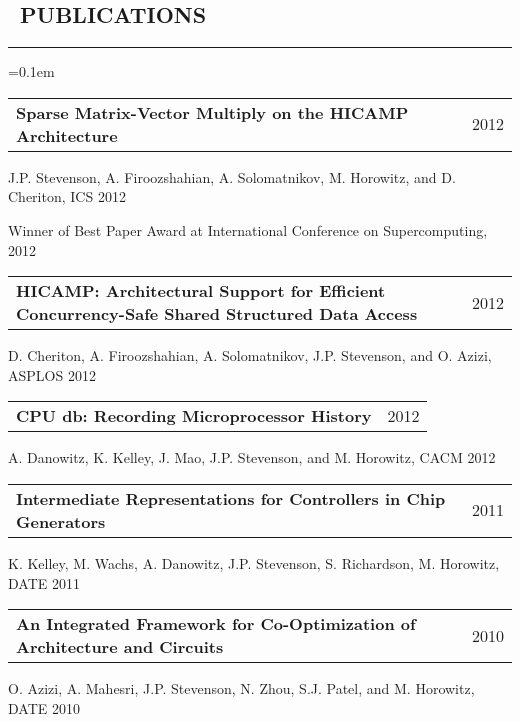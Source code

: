 \documentclass[10pt,letterpaper]{article}
\makeatletter
\newenvironment{indentsection}[1]%
{\begin{list}{}%
	{\setlength{\leftmargin}{#1}}%
	\item[]%
}
{\end{list}}
\newenvironment{changemargin}[2]
{%
    \begin{list}{}{%
        \setlength{\topsep}{0pt}%
        \setlength{\leftmargin}{#1}%
        \setlength{\rightmargin}{#2}%
        \setlength{\listparindent}{\parindent}%
        \setlength{\itemindent}{\parindent}%
        \setlength{\parsep}{\parskip}%
    }%
    \item[]
}%
{%
    \end{list}
}%
\newenvironment{content}
{%
    \begin{changemargin}{0cm}{2.5cm}
    \begin{itemize*}
        \vspace{-0.15em}
}%
{%
    \end{itemize*}
    \end{changemargin}
}%
\newenvironment{resumesection}[1]
{%
    \subsection*{\ #1}
    \vspace{-0.4em}
    \hrule
    \vspace{+0.4em}
    \begin{itemize}
        \parskip=0.1em
}%
{%
    \end{itemize}
}%
\newcommand{\headerrowx}[2]
{\item[] \begin{tabular*}{\linewidth}{l@{\extracolsep{\fill}}r}
	#1 &
	#2 \\
\end{tabular*}}
\newcommand{\CPP}
{C\nolinebreak[4]\hspace{-.05em}\raisebox{.22ex}{\footnotesize\bf +\hspace{-.20em}+}\ }
\makeatother
\begin{document}
\begin{resumesection}{PUBLICATIONS}
    \headerrowx{ \textbf{Sparse Matrix-Vector Multiply on the HICAMP Architecture}} {2012}
    \begin{content}
        \item[] J.P. Stevenson, A. Firoozshahian, A. Solomatnikov, M. Horowitz, and D. Cheriton, ICS 2012
        \item[] Winner of Best Paper Award at International Conference on Supercomputing, 2012
    \end{content}
    \headerrowx{ \textbf{HICAMP: Architectural Support for Efficient Concurrency-Safe Shared Structured Data Access}} {2012}
    \begin{content}
        \item[] D. Cheriton, A. Firoozshahian, A. Solomatnikov, J.P. Stevenson, and O. Azizi, ASPLOS 2012
    \end{content}
    \headerrowx{ \textbf{CPU db: Recording Microprocessor History}} {2012}
    \begin{content}
        \item[] A. Danowitz, K. Kelley, J. Mao, J.P. Stevenson, and M. Horowitz, CACM 2012
    \end{content}
    \headerrowx{ \textbf{Intermediate Representations for Controllers in Chip Generators}} {2011}
    \begin{content}
        \item[] K. Kelley, M. Wachs, A. Danowitz, J.P. Stevenson, S. Richardson, M. Horowitz, DATE 2011
    \end{content}
    \headerrowx{ \textbf{An Integrated Framework for Co-Optimization of Architecture and Circuits}} {2010}
    \begin{content}
        \item[] O. Azizi, A. Mahesri, J.P. Stevenson, N. Zhou, S.J. Patel, and M. Horowitz, DATE 2010
    \end{content}
\end{resumesection}

\end{document}
